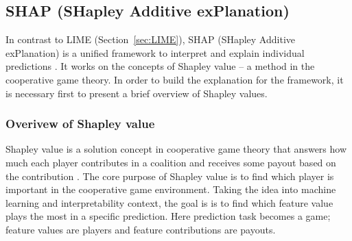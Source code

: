 \documentclass[english]{tktltiki2}
\theoremstyle{definition}
\theoremstyle{remark}
\begin{document}
\subsection{SHAP (SHapley Additive exPlanation)}\label{sec:SHAP} %

In contrast to LIME (Section~\ref{sec:LIME}), SHAP (SHapley Additive exPlanation) is a unified framework to interpret and explain individual predictions \citep{lundberg2017unified}. It works on the concepts of Shapley value \citep{shapley1953value} -- a method in the cooperative game theory. In order to build the explanation for the framework, it is necessary first to present a brief overview of Shapley values. 

\subsubsection{Overivew of Shapley value} %
Shapley value is a solution concept in cooperative game theory that answers how much each player contributes in a coalition and receives some payout based on the contribution \citep{shapley1953value}. The core purpose of Shapley value is to find which player is important in the cooperative game environment. Taking the idea into machine learning and interpretability context, the goal is is to find which feature value plays the most in a specific prediction. Here prediction task becomes a game; feature values are players and feature contributions are payouts.
\end{document}
